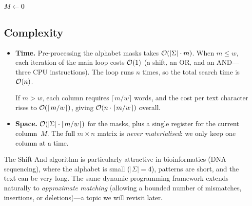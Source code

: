 \begin{algorithm}[H]
\caption{Shift-And exact matching}
\label{alg:shift-and}
\BlankLine
{}
\BlankLine
{}
$M \leftarrow 0$\;
\end{algorithm}

\subsection{Complexity}

\begin{itemize}[nosep]
  \item \textbf{Time.}
    Pre-processing the alphabet masks takes $\mathcal{O}\!\left(|\Sigma| \cdot m\right)$.
    When $m \le w$, each iteration of the main loop costs $\mathcal{O}\!\left(1\right)$
    (a shift, an OR, and an AND---three CPU instructions).
    The loop runs $n$ times, so the total search time is $\mathcal{O}\!\left(n\right)$.

    If $m > w$, each column requires $\lceil m/w \rceil$ words, and the
    cost per text character rises to $\mathcal{O}\!\left(\lceil m/w \rceil\right)$, giving
    $\mathcal{O}\!\left(n \cdot \lceil m/w \rceil\right)$ overall.

  \item \textbf{Space.}
    $\mathcal{O}\!\left(|\Sigma| \cdot \lceil m/w \rceil\right)$ for the masks, plus a single
    register for the current column~$M$.
    The full $m \times n$ matrix is \emph{never materialised}: we only
    keep one column at a time.
\end{itemize}

\begin{remark}
  The Shift-And algorithm is particularly attractive in bioinformatics
  (DNA sequencing), where the alphabet is small ($|\Sigma| = 4$), patterns
  are short, and the text can be very long.
  The same dynamic programming framework extends naturally to
  \emph{approximate matching} (allowing a bounded number of mismatches,
  insertions, or deletions)---a topic we will revisit later.
\end{remark}
